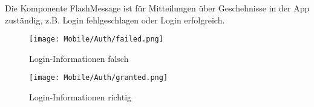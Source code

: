 Die Komponente FlashMessage ist für Mitteilungen über Geschehnisse in der App zuständig, z.B.
Login fehlgeschlagen oder Login erfolgreich.

\begin{figure}[H]
  \begin{center}
    \texttt{[image: Mobile/Auth/failed.png]}
    \caption{Login-Informationen falsch}
  \end{center}
\end{figure}

\begin{figure}[H]
  \begin{center}
    \texttt{[image: Mobile/Auth/granted.png]}
    \caption{Login-Informationen richtig}
  \end{center}
\end{figure}